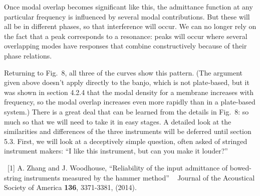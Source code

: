   Once modal overlap becomes significant like this, the admittance function at 
  any particular frequency is influenced by several modal contributions. But 
  these will all be in different phases, so that interference will occur. We 
  can no longer rely on the fact that a peak corresponds to a resonance: peaks 
  will occur where several overlapping modes have responses that combine 
  constructively because of their phase relations. 

  Returning to Fig.\ 8, all three of the curves show this pattern. (The 
  argument given above doesn't apply directly to the banjo, which is not 
  plate-based, but it was shown in section 4.2.4 that the modal density for a 
  membrane increases with frequency, so the modal overlap increases even more 
  rapidly than in a plate-based system.) There is a great deal that can be 
  learned from the details in Fig.\ 8: so much so that we will need to take it 
  in easy stages. A detailed look at the similarities and differences of the 
  three instruments will be deferred until section 5.3. First, we will look at 
  a deceptively simple question, often asked of stringed instrument makers: ``I 
  like this instrument, but can you make it louder?'' 



  ~[1] A. Zhang and J. Woodhouse, ``Reliability of the input admittance of 
  bowed-string instruments measured by the hammer method'' ~ Journal of the 
  Acoustical Society of America \textbf{136}, 3371-3381, (2014). 